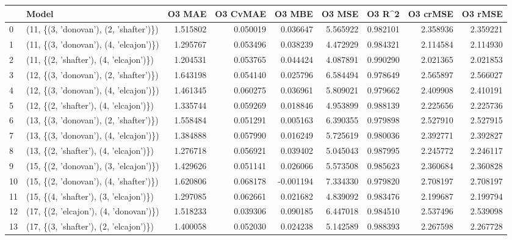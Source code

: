 \begin{tabular}{llrrrrrrr}
\toprule
{} &                                   Model &    O3 MAE &  O3 CvMAE &    O3 MBE &    O3 MSE &    O3 R\textasciicircum2 &  O3 crMSE &   O3 rMSE \\
\midrule
0  &  (11, \{(3, 'donovan'), (2, 'shafter')\}) &  1.515802 &  0.050019 &  0.036647 &  5.565922 &  0.982101 &  2.358936 &  2.359221 \\
1  &  (11, \{(3, 'donovan'), (4, 'elcajon')\}) &  1.295767 &  0.053496 &  0.038239 &  4.472929 &  0.984321 &  2.114584 &  2.114930 \\
2  &  (11, \{(2, 'shafter'), (4, 'elcajon')\}) &  1.204531 &  0.053765 &  0.044424 &  4.087891 &  0.990290 &  2.021365 &  2.021853 \\
3  &  (12, \{(3, 'donovan'), (2, 'shafter')\}) &  1.643198 &  0.054140 &  0.025796 &  6.584494 &  0.978649 &  2.565897 &  2.566027 \\
4  &  (12, \{(3, 'donovan'), (4, 'elcajon')\}) &  1.461345 &  0.060275 &  0.036961 &  5.809021 &  0.979662 &  2.409908 &  2.410191 \\
5  &  (12, \{(2, 'shafter'), (4, 'elcajon')\}) &  1.335744 &  0.059269 &  0.018846 &  4.953899 &  0.988139 &  2.225656 &  2.225736 \\
6  &  (13, \{(3, 'donovan'), (2, 'shafter')\}) &  1.558484 &  0.051291 &  0.005163 &  6.390355 &  0.979898 &  2.527910 &  2.527915 \\
7  &  (13, \{(3, 'donovan'), (4, 'elcajon')\}) &  1.384888 &  0.057990 &  0.016249 &  5.725619 &  0.980036 &  2.392771 &  2.392827 \\
8  &  (13, \{(2, 'shafter'), (4, 'elcajon')\}) &  1.276718 &  0.056921 &  0.039402 &  5.045043 &  0.987995 &  2.245772 &  2.246117 \\
9  &  (15, \{(2, 'donovan'), (3, 'elcajon')\}) &  1.429626 &  0.051141 &  0.026066 &  5.573508 &  0.985623 &  2.360684 &  2.360828 \\
10 &  (15, \{(2, 'donovan'), (4, 'shafter')\}) &  1.620806 &  0.068178 & -0.001194 &  7.334330 &  0.979820 &  2.708197 &  2.708197 \\
11 &  (15, \{(4, 'shafter'), (3, 'elcajon')\}) &  1.297085 &  0.062661 &  0.021682 &  4.839092 &  0.983476 &  2.199687 &  2.199794 \\
12 &  (17, \{(2, 'elcajon'), (4, 'donovan')\}) &  1.518233 &  0.039306 &  0.090185 &  6.447018 &  0.984510 &  2.537496 &  2.539098 \\
13 &  (17, \{(3, 'shafter'), (2, 'elcajon')\}) &  1.400058 &  0.052030 &  0.024238 &  5.142589 &  0.988393 &  2.267598 &  2.267728 \\

\end{tabular}
